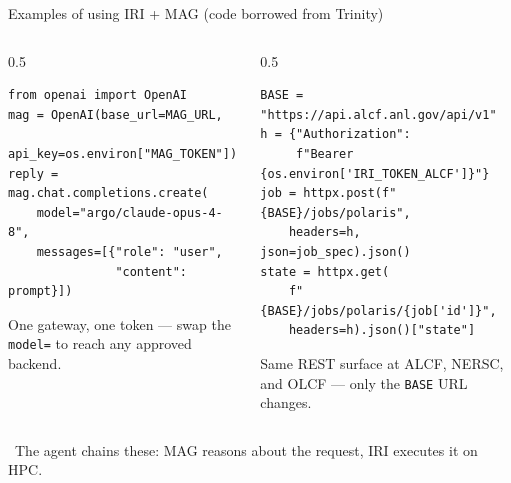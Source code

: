 \documentclass[aspectratio=169,11pt]{beamer}
\begin{document}
\begin{frame}[fragile]{Examples of using IRI + MAG \small(code borrowed from Trinity)}
  \begin{columns}[T,totalwidth=\textwidth]
    \begin{column}{0.5\textwidth}
      \noindent{}\par\vspace{2pt}
      \begin{lstlisting}[style=pysnip]
from openai import OpenAI
mag = OpenAI(base_url=MAG_URL,
             api_key=os.environ["MAG_TOKEN"])
reply = mag.chat.completions.create(
    model="argo/claude-opus-4-8",
    messages=[{"role": "user",
               "content": prompt}])
      \end{lstlisting}
      \vspace{2pt}
      {\scriptsize\color{midgray} One gateway, one token --- swap the
      \texttt{model=} to reach any approved backend.}
    \end{column}
    \begin{column}{0.5\textwidth}
      \noindent{}\par\vspace{2pt}
      \begin{lstlisting}[style=pysnip]
BASE = "https://api.alcf.anl.gov/api/v1"
h = {"Authorization":
     f"Bearer {os.environ['IRI_TOKEN_ALCF']}"}
job = httpx.post(f"{BASE}/jobs/polaris",
    headers=h, json=job_spec).json()
state = httpx.get(
    f"{BASE}/jobs/polaris/{job['id']}",
    headers=h).json()["state"]
      \end{lstlisting}
      \vspace{2pt}
      {\scriptsize\color{midgray} Same REST surface at ALCF, NERSC, and
      OLCF --- only the \texttt{BASE} URL changes.}
    \end{column}
  \end{columns}
  \vspace{6pt}
  \begin{center}
    {\footnotesize\color{midgray}
      \faLightbulb\ The agent chains these: MAG reasons about the request,
      IRI executes it on HPC.}
  \end{center}
\end{frame}
\end{document}
